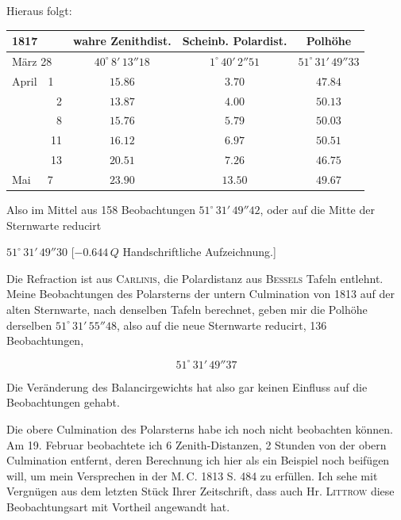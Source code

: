\par\indent Hieraus folgt:

\begin{center}
\fontsize{9}{11}\selectfont
\setlength{\tabcolsep}{3pt}
\begin{tabular}{l|c|c|c}
1817 & wahre Zenithdist. & Scheinb. Polardist. & Polhöhe \\
\hline
März 28 & $40^\circ\,8'\,13''18$ & $1^\circ\,40'\,2''51$ & $51^\circ\,31'\,49''33$ \\
April\ \ 1 & $15.86$ & $3.70$ & $47.84$ \\
\ \ \ \ \ \ \ \ 2 & $13.87$ & $4.00$ & $50.13$ \\
\ \ \ \ \ \ \ \ 8 & $15.76$ & $5.79$ & $50.03$ \\
\ \ \ \ \ \ \ 11 & $16.12$ & $6.97$ & $50.51$ \\
\ \ \ \ \ \ \ 13 & $20.51$ & $7.26$ & $46.75$ \\
Mai\ \ \ 7 & $23.90$ & $13.50$ & $49.67$ \\
\end{tabular}
\end{center}

\par\indent Also im Mittel aus 158 Beobachtungen $51^\circ\,31'\,49''42$, oder auf die Mitte der Sternwarte reducirt

\begin{center}\fontsize{10}{12}\selectfont $51^\circ\,31'\,49''30$ [$-0.644\,Q$ Handschriftliche Aufzeichnung.]\end{center}

\par\indent Die Refraction ist aus \textsc{Carlinis}, die Polardistanz aus \textsc{Bessels} Tafeln entlehnt. Meine Beobachtungen des Polarsterns der untern Culmination von 1813 auf der alten Sternwarte, nach denselben Tafeln berechnet, geben mir die Polhöhe derselben $51^\circ\,31'\,55''48$, also auf die neue Sternwarte reducirt, 136 Beobachtungen,

\[ 51^\circ\,31'\,49''37 \]

\par\indent Die Veränderung des Balancirgewichts hat also gar keinen Einfluss auf die Beobachtungen gehabt.

\par\indent Die obere Culmination des Polarsterns habe ich noch nicht beobachten können. Am 19. Februar beobachtete ich 6 Zenith-Distanzen, 2 Stunden von der obern Culmination entfernt, deren Berechnung ich hier als ein Beispiel noch beifügen will, um mein Versprechen in der M.\,C. 1813 S. 484 zu erfüllen. Ich sehe mit Vergnügen aus dem letzten Stück Ihrer Zeitschrift, dass auch Hr. \textsc{Littrow} diese Beobachtungsart mit Vortheil angewandt hat.

